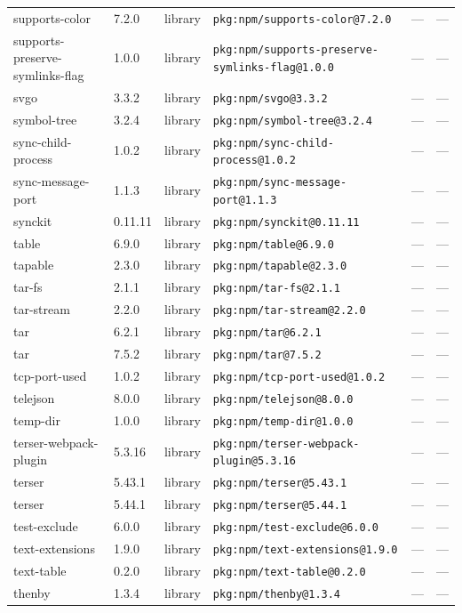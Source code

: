 \documentclass[11pt]{article}
\begin{document}
\begin{longtable}{|l|l|l|p{2.2cm}|l|p{4cm}|}
supports-color & 7.2.0 & library & \texttt{pkg:npm/supports-color@7.2.0} & — & — \\
supports-preserve-symlinks-flag & 1.0.0 & library & \texttt{pkg:npm/supports-preserve-symlinks-flag@1.0.0} & — & — \\
svgo & 3.3.2 & library & \texttt{pkg:npm/svgo@3.3.2} & — & — \\
symbol-tree & 3.2.4 & library & \texttt{pkg:npm/symbol-tree@3.2.4} & — & — \\
sync-child-process & 1.0.2 & library & \texttt{pkg:npm/sync-child-process@1.0.2} & — & — \\
sync-message-port & 1.1.3 & library & \texttt{pkg:npm/sync-message-port@1.1.3} & — & — \\
synckit & 0.11.11 & library & \texttt{pkg:npm/synckit@0.11.11} & — & — \\
table & 6.9.0 & library & \texttt{pkg:npm/table@6.9.0} & — & — \\
tapable & 2.3.0 & library & \texttt{pkg:npm/tapable@2.3.0} & — & — \\
tar-fs & 2.1.1 & library & \texttt{pkg:npm/tar-fs@2.1.1} & — & — \\
tar-stream & 2.2.0 & library & \texttt{pkg:npm/tar-stream@2.2.0} & — & — \\
tar & 6.2.1 & library & \texttt{pkg:npm/tar@6.2.1} & — & — \\
tar & 7.5.2 & library & \texttt{pkg:npm/tar@7.5.2} & — & — \\
tcp-port-used & 1.0.2 & library & \texttt{pkg:npm/tcp-port-used@1.0.2} & — & — \\
telejson & 8.0.0 & library & \texttt{pkg:npm/telejson@8.0.0} & — & — \\
temp-dir & 1.0.0 & library & \texttt{pkg:npm/temp-dir@1.0.0} & — & — \\
terser-webpack-plugin & 5.3.16 & library & \texttt{pkg:npm/terser-webpack-plugin@5.3.16} & — & — \\
terser & 5.43.1 & library & \texttt{pkg:npm/terser@5.43.1} & — & — \\
terser & 5.44.1 & library & \texttt{pkg:npm/terser@5.44.1} & — & — \\
test-exclude & 6.0.0 & library & \texttt{pkg:npm/test-exclude@6.0.0} & — & — \\
text-extensions & 1.9.0 & library & \texttt{pkg:npm/text-extensions@1.9.0} & — & — \\
text-table & 0.2.0 & library & \texttt{pkg:npm/text-table@0.2.0} & — & — \\
thenby & 1.3.4 & library & \texttt{pkg:npm/thenby@1.3.4} & — & — \\

\end{longtable}
\end{document}
